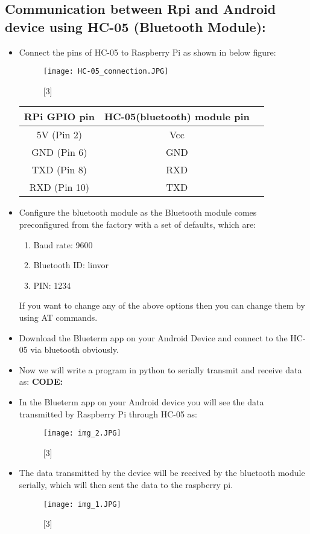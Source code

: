 \documentclass[11pt,a4paper]{article}
\begin{document}
	\subsection{Communication between Rpi and Android device using HC-05 (Bluetooth Module):}
	\begin{itemize}
		\item Connect the pins of HC-05 to Raspberry Pi as shown in below figure:
		\begin{figure}[h!]
			\texttt{[image: HC-05\_connection.JPG]}
			\centering
			\caption{[3]}
		\end{figure}
		\newpage 
		\begin{tabular}{|c|c|c|}
			\hline
			RPi GPIO pin & HC-05(bluetooth) module pin \\
			\hline 
			5V (Pin 2) & Vcc\\
			\hline
			GND (Pin 6) & GND\\
			\hline 
			TXD (Pin 8) & RXD\\
			\hline 
			RXD (Pin 10) & TXD\\
			\hline			
		\end{tabular}
		\flushleft
	\end{itemize}
	\begin{itemize}
		\item Configure the bluetooth module as the Bluetooth module comes preconfigured from the factory with a set of defaults, which are:
			\begin{enumerate}
			\item Baud rate: 9600
			\item Bluetooth ID: linvor
			\item PIN: 1234
			\end{enumerate}
		 If you want to change any of the above options then you can change them by using AT commands.
		\item Download the Blueterm app on your Android Device and connect to the HC-05 via bluetooth obviously.
		\item Now we will write a program in python to serially transmit and receive data as:
		\newline \textbf{CODE:}
		\newline 
		\vspace{0.3cm}
		
		
		\newpage
		\item In the Blueterm app on your Android device you will see the data transmitted by Raspberry Pi through HC-05 as:
		\newline 
		\begin{figure}[h!]
			\texttt{[image: img\_2.JPG]}
			\centering
			\caption{[3]}
		\end{figure} 
		\newline
		\item The data transmitted by the device will be received by the bluetooth module serially, which will then sent the data to the raspberry pi.
		 \begin{figure}[h!]
		 	\texttt{[image: img\_1.JPG]}
		 	\centering
		 	\caption{[3]}
		 \end{figure}  
	\end{itemize}
\end{document}
